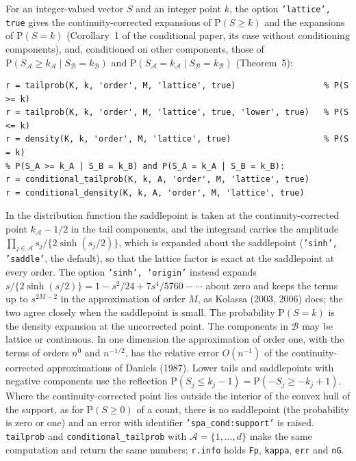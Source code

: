 \documentclass[11pt]{article}
\newcommand{\prog}[1]{\texttt{#1}}
\newcommand{\pr}{\mathrm{P}}
\begin{document}
For an integer-valued vector $S$ and an integer point $k$, the option \prog{'lattice', true} gives
the continuity-corrected expansions of $\pr(S\geq k)$ and the expansions of $\pr(S=k)$ (Corollary~1
of the conditional paper, its case without conditioning components), and, conditioned on other
components, those of $\pr(S_{\mathcal A}\geq k_{\mathcal A}\mid S_{\mathcal B}=k_{\mathcal B})$ and
$\pr(S_{\mathcal A}=k_{\mathcal A}\mid S_{\mathcal B}=k_{\mathcal B})$ (Theorem~5):
\begin{lstlisting}
r = tailprob(K, k, 'order', M, 'lattice', true)                  % P(S >= k)
r = tailprob(K, k, 'order', M, 'lattice', true, 'lower', true)   % P(S <= k)
r = density(K, k, 'order', M, 'lattice', true)                   % P(S = k)
% P(S_A >= k_A | S_B = k_B) and P(S_A = k_A | S_B = k_B):
r = conditional_tailprob(K, k, A, 'order', M, 'lattice', true)
r = conditional_density(K, k, A, 'order', M, 'lattice', true)
\end{lstlisting}
In the distribution function the saddlepoint is taken at the continuity-corrected point
$k_{\mathcal A}-1/2$ in the tail components, and the integrand carries the amplitude
$\prod_{j\in\mathcal A}s_j/\{2\sinh(s_j/2)\}$, which is expanded about the saddlepoint
(\prog{'sinh', 'saddle'}, the default), so that the lattice factor is exact at the saddlepoint at
every order. The option \prog{'sinh', 'origin'} instead expands $s/\{2\sinh(s/2)\}=1-s^2/24+7s^4/5760-\cdots$
about zero and keeps the terms up to $s^{2M-2}$ in the approximation of order $M$, as Kolassa (2003,
2006) does; the two agree closely when the saddlepoint is small. The probability $\pr(S=k)$ is the
density expansion at the uncorrected point. The components in $\mathcal B$ may be lattice or
continuous. In one dimension the approximation of order one, with the terms of orders $n^0$ and
$n^{-1/2}$, has the relative error $O(n^{-1})$ of the continuity-corrected approximations of
Daniels (1987). Lower tails and saddlepoints with negative components use the reflection
$\pr(S_j\leq k_j-1)=\pr(-S_j\geq-k_j+1)$. Where the continuity-corrected point lies outside the
interior of the convex hull of the support, as for $\pr(S\geq0)$ of a count, there is no saddlepoint
(the probability is zero or one) and an error with identifier \prog{'spa\_cond:support'} is raised.
\prog{tailprob} and \prog{conditional\_tailprob} with $\mathcal A=\{1,\ldots,d\}$ make the same
computation and return the same numbers; \prog{r.info} holds \prog{Fp}, \prog{kappa}, \prog{err} and
\prog{nG}.
\end{document}
